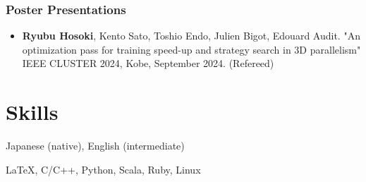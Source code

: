\documentclass[10pt]{article}
\begin{document}
\subsubsection{Poster Presentations}
\begin{itemize}[align=left,leftmargin=0.5cm,style=multiline]
  \item {\bf Ryubu Hosoki}, Kento Sato, Toshio Endo, Julien Bigot, Edouard Audit. "An optimization pass for training speed-up and strategy search in 3D parallelism" IEEE CLUSTER 2024, Kobe, September 2024. (Refereed)
\end{itemize}



\section{Skills}
\begin{description}[align=left,leftmargin=2.5cm,style=multiline]
  \setlength{\itemsep}{0pt}
  \item [Languages] Japanese (native), English (intermediate)
  \item [Coding] \LaTeX, C/C++, Python, Scala, Ruby, Linux
\end{description}
\end{document}
